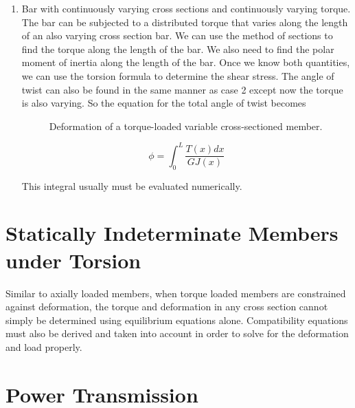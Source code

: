 \documentclass[
10pt,
a4paper,
openany,
svgnames,
]{book} %
\begin{document}
\begin{enumerate}
\item Bar with continuously varying cross sections and continuously varying torque. The bar can be subjected to a distributed torque that varies along the length of an also varying cross section bar. We can use the method of sections to find the torque along the length of the bar. We also need to find the polar moment of inertia along the length of the bar. Once we know both quantities, we can use the torsion formula to determine the shear stress. The angle of twist can also be found in the same manner as case 2 except now the torque is also varying. So the equation for the total angle of twist becomes

    \begin{figure}[h]
    \centering
    \caption{Deformation of a torque-loaded variable cross-sectioned member.}
  \end{figure}
  
  \begin{equation}
    \phi  = \int_0^L \frac{T(x)dx}{G{J(x)}}
  \end{equation}
  
  This integral usually must be evaluated numerically.
\end{enumerate}
  
\section{Statically Indeterminate Members under Torsion}

Similar to axially loaded members, when torque loaded members are constrained against deformation, the torque and deformation in any cross section cannot simply be determined using equilibrium equations alone. Compatibility equations must also be derived and taken into account in order to solve for the deformation and load properly.

\section{Power Transmission}
\end{document}
